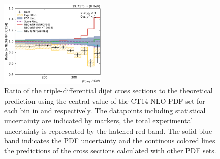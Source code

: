 \begin{figure}[htbp]
    \includegraphics[width=0.45\textwidth]{figures/measurement/ratio_to_CT14nlo+np_totcomp_yb2ys0.pdf}
    \caption[Ratio of the cross section to CT14 NLO]{
    Ratio of the triple-differential dijet cross sections to the theoretical
    prediction using the central value of the CT14 NLO PDF set for each bin in \ystar
    and \yboost respectively. The datapoints including statistical uncertainty are
    indicated by markers, the total experimental uncertainty is represented by the
    hatched red band. The solid blue band indicates the PDF uncertainty and the
    continous colored lines the predictions of the cross sections calculated with
    other PDF sets.}
    \label{fig:ratio_ct14_nlo}
\end{figure}

